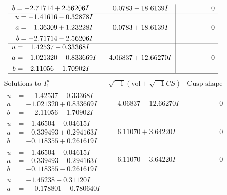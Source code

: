 \documentclass[1p]{elsarticle_modified}
\theoremstyle{definition}
\newcommand{\I}{\sqrt{-1}}
\begin{document}
$$\begin{array}{c|c|c}
\begin{aligned}
b &= -2.71714 + 2.56206 I\end{aligned}
 & \phantom{-}0.0783 - 18.6139 I & \phantom{-0.000000 } 0 \\ \hline\begin{aligned}
u &= -1.41616 - 0.32878 I \\
a &= \phantom{-}1.36309 + 1.23228 I \\
b &= -2.71714 - 2.56206 I\end{aligned}
 & \phantom{-}0.0783 + 18.6139 I & \phantom{-0.000000 } 0 \\ \hline\begin{aligned}
u &= \phantom{-}1.42537 + 0.33368 I \\
a &= -1.021320 - 0.833669 I \\
b &= \phantom{-}2.11056 + 1.70902 I\end{aligned}
 & \phantom{-}4.06837 + 12.66270 I & \phantom{-0.000000 } 0\\
 \hline 
 \end{array}$$\newpage$$\begin{array}{c|c|c}  
\text{Solutions to }I^u_{1}& \I (\text{vol} + \sqrt{-1}CS) & \text{Cusp shape}\\
 \hline 
\begin{aligned}
u &= \phantom{-}1.42537 - 0.33368 I \\
a &= -1.021320 + 0.833669 I \\
b &= \phantom{-}2.11056 - 1.70902 I\end{aligned}
 & \phantom{-}4.06837 - 12.66270 I & \phantom{-0.000000 } 0 \\ \hline\begin{aligned}
u &= -1.46504 + 0.04615 I \\
a &= -0.339493 + 0.294163 I \\
b &= -0.118355 + 0.261619 I\end{aligned}
 & \phantom{-}6.11070 + 3.64220 I & \phantom{-0.000000 } 0 \\ \hline\begin{aligned}
u &= -1.46504 - 0.04615 I \\
a &= -0.339493 - 0.294163 I \\
b &= -0.118355 - 0.261619 I\end{aligned}
 & \phantom{-}6.11070 - 3.64220 I & \phantom{-0.000000 } 0 \\ \hline\begin{aligned}
u &= -1.45238 + 0.31120 I \\
a &= \phantom{-}0.178801 - 0.780640 I \\

\end{aligned}
\end{array}$$
\end{document}
